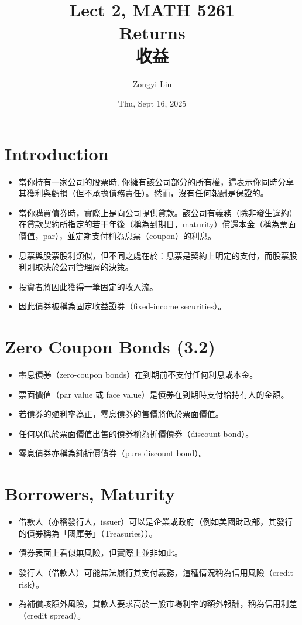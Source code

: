 \documentclass[letterpaper]{article}
\title{Lect 2, MATH 5261 \\
		\small{Returns\\
			收益
		}
	}
\author{Zongyi Liu}
\date{Thu, Sept 16, 2025}
\begin{document}
		\maketitle

\tableofcontents
\section*{Introduction}
\begin{itemize}
	\item 當你持有一家公司的股票時, 你擁有該公司部分的所有權，這表示你同時分享其獲利與虧損（但不承擔債務責任）。然而，沒有任何報酬是保證的。
	\item 當你購買債券時，實際上是向公司提供貸款。該公司有義務（除非發生違約）在貸款契約所指定的若干年後（稱為到期日，maturity）償還本金（稱為票面價值，par），並定期支付稱為息票（coupon）的利息。
	\item 息票與股票股利類似，但不同之處在於：息票是契約上明定的支付，而股票股利則取決於公司管理層的決策。
	\item 投資者將因此獲得一筆固定的收入流。
	\item 因此債券被稱為固定收益證券（fixed-income securities）。
\end{itemize}

\section*{Zero Coupon Bonds (3.2)}
\begin{itemize}
	\item 零息債券（zero-coupon bonds）在到期前不支付任何利息或本金。
	\item 票面價值（par value 或 face value）是債券在到期時支付給持有人的金額。
	\item 若債券的殖利率為正，零息債券的售價將低於票面價值。
	\item 任何以低於票面價值出售的債券稱為折價債券（discount bond）。
	\item 零息債券亦稱為純折價債券（pure discount bond）。
\end{itemize}

\section*{Borrowers, Maturity}
\begin{itemize}
	\item 借款人（亦稱發行人，issuer）可以是企業或政府（例如美國財政部，其發行的債券稱為「國庫券」（Treasuries））。
	\item 債券表面上看似無風險，但實際上並非如此。
	\item 發行人（借款人）可能無法履行其支付義務，這種情況稱為信用風險（credit risk）。
	\item 為補償該額外風險，貸款人要求高於一般市場利率的額外報酬，稱為信用利差（credit spread）。
\end{itemize}
\end{document}
